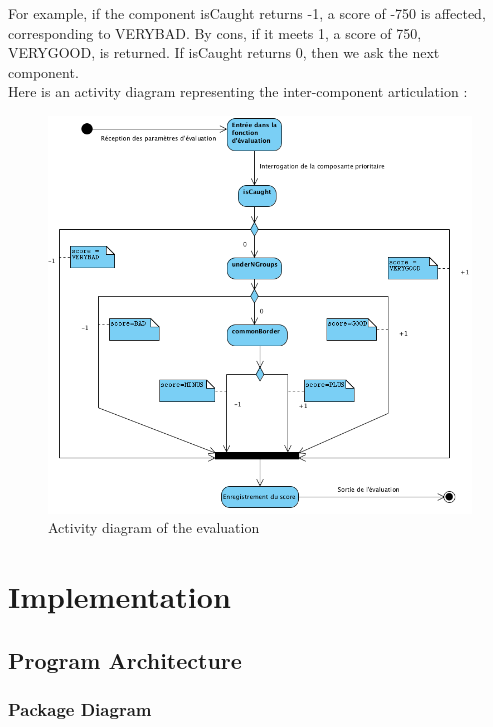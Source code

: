 \documentclass[11pt,a4paper]{report}
\begin{document}
For example, if the component isCaught returns -1, a score of -750 is affected, corresponding to VERYBAD. By cons, if it meets 1, a score of 750, VERYGOOD, is returned. If isCaught returns 0, then we ask the next component.\\



Here is an activity diagram representing the inter-component articulation :

\begin{figure}[h]
\centering
\includegraphics[width=1\textwidth]{activity_diagram.png}
\caption{Activity diagram of the evaluation}
\label{activity_diagram}
\end{figure}

\chapter*{Implementation}

\section*{Program Architecture}

\subsection*{Package Diagram}
\end{document}
